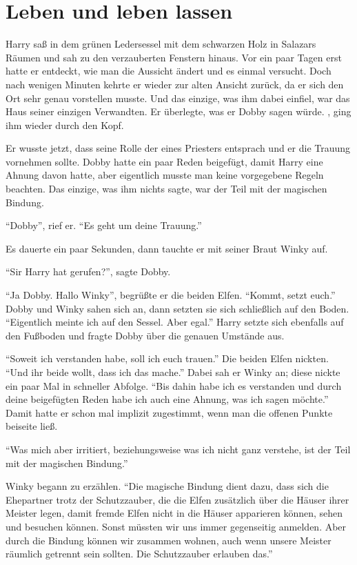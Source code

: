 \chapter{Leben und leben lassen}


Harry saß in dem grünen Ledersessel mit dem schwarzen Holz in Salazars Räumen und sah zu den verzauberten Fenstern hinaus. Vor ein paar Tagen erst hatte er entdeckt, wie man die Aussicht ändert und es einmal versucht. Doch nach wenigen Minuten kehrte er wieder zur alten Ansicht zurück, da er sich den Ort sehr genau vorstellen musste. Und das einzige, was ihm dabei einfiel, war das Haus seiner einzigen Verwandten. Er überlegte, was er Dobby sagen würde. , ging ihm wieder durch den Kopf.

Er wusste jetzt, dass seine Rolle der eines Priesters entsprach und er die Trauung vornehmen sollte. Dobby hatte ein paar Reden beigefügt, damit Harry eine Ahnung davon hatte, aber eigentlich musste man keine vorgegebene Regeln beachten. Das einzige, was ihm nichts sagte, war der Teil mit der magischen Bindung.

\enquote{Dobby}, rief er. \enquote{Es geht um deine Trauung.}

Es dauerte ein paar Sekunden, dann tauchte er mit seiner Braut Winky auf.

\enquote{Sir Harry hat gerufen?}, sagte Dobby.

\enquote{Ja Dobby. Hallo Winky}, begrüßte er die beiden Elfen. \enquote{Kommt, setzt euch.} Dobby und Winky sahen sich an, dann setzten sie sich schließlich auf den Boden. \enquote{Eigentlich meinte ich auf den Sessel. Aber egal.} Harry setzte sich ebenfalls auf den Fußboden und fragte Dobby über die genauen Umstände aus.

\enquote{Soweit ich verstanden habe, soll ich euch trauen.} Die beiden Elfen nickten. \enquote{Und ihr beide wollt, dass ich das mache.} Dabei sah er Winky an; diese nickte ein paar Mal in schneller Abfolge. \enquote{Bis dahin habe ich es verstanden und durch deine beigefügten Reden habe ich auch eine Ahnung, was ich sagen möchte.} Damit hatte er schon mal implizit zugestimmt, wenn man die offenen Punkte beiseite ließ.

\enquote{Was mich aber irritiert, beziehungsweise was ich nicht ganz verstehe, ist der Teil mit der magischen Bindung.}

Winky begann zu erzählen. \enquote{Die magische Bindung dient dazu, dass sich die Ehepartner trotz der Schutzzauber, die die Elfen zusätzlich über die Häuser ihrer Meister legen, damit fremde Elfen nicht in die Häuser apparieren können, sehen und besuchen können. Sonst müssten wir uns immer gegenseitig anmelden. Aber durch die Bindung können wir zusammen wohnen, auch wenn unsere Meister räumlich getrennt sein sollten. Die Schutzzauber erlauben das.}

